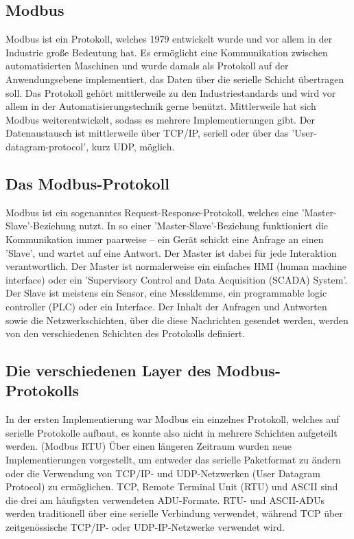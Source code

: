 \subsection{Modbus}\label{modbusprotokoll} 


Modbus ist ein Protokoll, welches 1979 entwickelt wurde und vor allem in der Industrie große Bedeutung hat. Es ermöglicht eine Kommunikation zwischen automatisierten Maschinen und wurde damals als Protokoll auf der Anwendungsebene implementiert, das Daten über die serielle Schicht übertragen soll. Das Protokoll gehört mittlerweile zu den Industriestandards und wird vor allem in der Automatisierungstechnik gerne benützt. Mittlerweile hat sich Modbus weiterentwickelt, sodass es mehrere Implementierungen gibt. Der Datenaustausch ist mittlerweile über TCP/IP, seriell oder über das 'User-datagram-protocol', kurz UDP, möglich.
\cite{ModbusgrundlagenKubunu} \cite{modbuskubunu}


\subsection{Das Modbus-Protokoll}
Modbus ist ein sogenanntes Request-Response-Protokoll, welches eine 'Master-Slave'-Beziehung nutzt. In so einer 'Master-Slave'-Beziehung funktioniert die Kommunikation immer paarweise – ein Gerät schickt eine Anfrage an einen 'Slave', und wartet auf eine Antwort. Der Master ist dabei für jede Interaktion verantwortlich. Der Master ist normalerweise ein einfaches HMI (human machine interface) oder ein 'Supervisory Control and Data Acquisition (SCADA) System'. Der Slave ist meistens ein Sensor, eine Messklemme, ein programmable logic controller (PLC) oder ein Interface. Der Inhalt der Anfragen und Antworten sowie die Netzwerkschichten, über die diese Nachrichten gesendet werden, werden von den verschiedenen Schichten des Protokolls definiert.
\cite{modbusoverserial}
\subsection{Die verschiedenen Layer des Modbus-Protokolls }
In der ersten Implementierung war Modbus ein einzelnes Protokoll, welches auf serielle Protokolle aufbaut, es konnte also nicht in mehrere Schichten aufgeteilt werden. (Modbus RTU)
Über einen längeren Zeitraum wurden neue Implementierungen vorgestellt, um entweder das serielle Paketformat zu ändern oder die Verwendung von TCP/IP- und UDP-Netzwerken (User Datagram Protocol) zu ermöglichen. TCP, Remote Terminal Unit (RTU) und ASCII sind die drei am häufigsten verwendeten ADU-Formate. RTU- und ASCII-ADUs werden traditionell über eine serielle Verbindung verwendet, während TCP über zeitgenössische TCP/IP- oder UDP-IP-Netzwerke verwendet wird.




